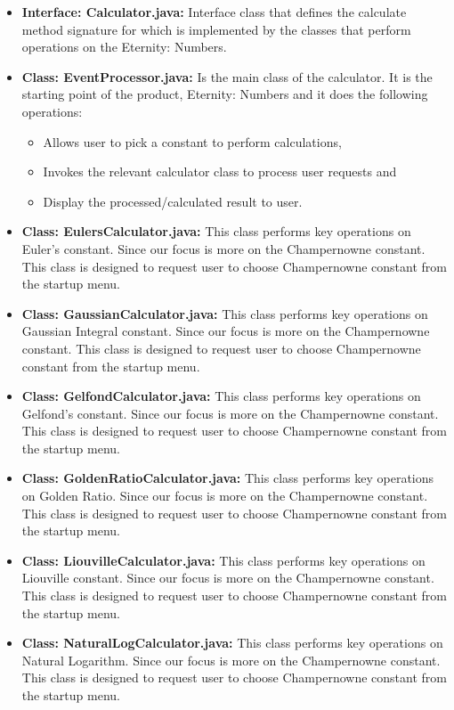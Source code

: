 \documentclass[12pt, a4paper]{report}
\begin{document}
\begin{itemize}
    \item \textbf{Interface: Calculator.java:} Interface class that defines the calculate method signature for which is implemented by the classes that perform operations on the Eternity: Numbers.
    \item \textbf{Class: EventProcessor.java:} Is the main class of the calculator. It is the starting point of the product, Eternity: Numbers and it does the following operations:
    \begin{itemize}
        \item Allows user to pick a constant to perform calculations,
        \item Invokes the relevant calculator class to process user requests and
        \item Display the processed/calculated result to user.
    \end{itemize}
    \item \textbf{Class: EulersCalculator.java:} This class performs key operations on Euler’s constant. Since our focus is more on the Champernowne constant. This class is designed to request user to choose Champernowne constant from the startup menu.
    \item \textbf{Class: GaussianCalculator.java:} This class performs key operations on Gaussian Integral constant. Since our focus is more on the Champernowne constant. This class is designed to request user to choose Champernowne constant from the startup menu.
    \item \textbf{Class: GelfondCalculator.java:} This class performs key operations on Gelfond’s constant. Since our focus is more on the Champernowne constant. This class is designed to request user to choose Champernowne constant from the startup menu.
    \item \textbf{Class: GoldenRatioCalculator.java:} This class performs key operations on Golden Ratio. Since our focus is more on the Champernowne constant. This class is designed to request user to choose Champernowne constant from the startup menu.
    \item \textbf{Class: LiouvilleCalculator.java:} This class performs key operations on Liouville constant. Since our focus is more on the Champernowne constant. This class is designed to request user to choose Champernowne constant from the startup menu.
    \item \textbf{Class: NaturalLogCalculator.java:} This class performs key operations on Natural Logarithm. Since our focus is more on the Champernowne constant. This class is designed to request user to choose Champernowne constant from the startup menu.

\end{itemize}
\end{document}
